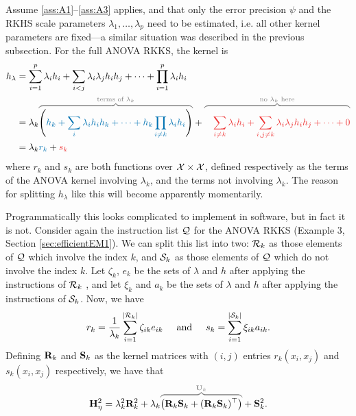 Assume \ref{ass:A1}--\ref{ass:A3} applies, and that only the error precision $\psi$ and the RKHS scale parameters $\lambda_1,\dots,\lambda_p$ need to be estimated, i.e. all other kernel parameters are fixed---a similar situation was described in the previous subsection.
For the full ANOVA RKKS, the kernel is
\begin{align*}
  h_\lambda 
  &= \sum_{i=1}^p \lambda_i h_i + \sum_{i<j} \lambda_i \lambda_j h_i h_j + \cdots + \prod_{i=1}^p \lambda_i h_i \\
  &= \lambda_k 
  \myoverbrace{
  \Bigg(  
  {\color{colblu} h_k + \sum_{i} \lambda_i h_i h_k + \cdots + h_k \prod_{i\neq k} \lambda_i h_i}
  \Bigg)
  }{\text{terms of $\lambda_k$}} 
  + 
  \myoverbrace{\color{colred}
  \phantom{\Bigg(}
  \sum_{i\neq k} \lambda_i h_i + \sum_{i,j \neq k} \lambda_i \lambda_j h_i h_j + \cdots + 0
  }{\text{no $\lambda_k$ here}} \\
  &= \lambda_k {\color{colblu}r_k} + {\color{colred}s_k}
\end{align*}
where $r_k$ and $s_k$ are both functions over ${\mathcal X}\times{\mathcal X}$, defined respectively as the terms of the ANOVA kernel involving $\lambda_k$, and the terms not involving $\lambda_k$.
The reason for splitting $h_\lambda$ like this will become apparently momentarily.

Programmatically this looks complicated to implement in software, but in fact it is not.
Consider again the instruction list ${\mathcal Q}$ for the ANOVA RKKS (Example 3, Section \ref{sec:efficientEM1}).
We can split this list into two: ${\mathcal R}_k$ as those elements of ${\mathcal Q}$ which involve the index $k$, and ${\mathcal S}_k$ as those elements of ${\mathcal Q}$ which do not involve the index $k$.
Let $\zeta_k$, $e_k$ be the sets of $\lambda$ and $h$ after applying the instructions of ${\mathcal R}_k$ 
, and let $\xi_k$ and $a_k$ be the sets of $\lambda$ and $h$ after applying the instructions of ${\mathcal S}_k$.
Now, we have 
\[
  r_k = \frac{1}{\lambda_k} \sum_{i=1}^{\lvert{\mathcal R}_k\rvert} \zeta_{ik} e_{ik} 
  \hspace{0.5cm}\text{and}\hspace{0.5cm}
  s_k = \sum_{i=1}^{\lvert{\mathcal S}_k\rvert} \xi_{ik} a_{ik}.   
\]
Defining ${\mathbf R}_k$ and ${\mathbf S}_k$ as the kernel matrices with $(i,j)$ entries $r_k(x_i,x_j)$ and $s_k(x_i,x_j)$ respectively, we have that
\[
  \bH_\eta^2 = \lambda_k^2\bR_k^2 + \lambda_k \myoverbrace{\big(\bR_k\bS_k + (\bR_k\bS_k)^\top \big)}{\bU_k} + \bS_k^2.
\]

